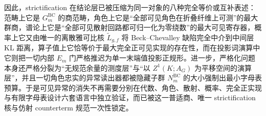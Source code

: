 





\noindent
因此，strictification 在结论层已被压缩为同一对象的八种完全等价或互补表述：范畴上它是 \(G_m^{\mathrm{BC}}\) 的商范畴，角色上它是“全部可见角色在折叠纤维上可测”的最大群商，谱论上它是“全部可见散射回路都可归一化为零绕数”的最大可见寄存器，概率上它又由唯一的离散雅可比核 \(\widetilde L_{g,f}\) 将 Beck--Chevalley 缺陷完全中介到中间层 KL 距离，算子值上它恰等价于最大完全正可见实现的存在性，而在投影词演算中它则把一切内部 \(E_m\) 门严格推迟为单一末端值投影正规形。进一步，严格化问题本身还严格分裂为“无规范余量的测度层”与“以 \(Z^1(K;A_G)\) 为平移空间的演算层”，并且一切角色忠实的异常读出器都被隐藏子群 \(N_m^{\mathrm{BC}}\) 的大小强制出最小字母表预算。于是可见异常的消失不再需要分别在代数、角色、散射、概率、完全正实现与有限字母表设计六套语言中独立验证，而已被这一普适商、唯一 strictification 核与仿射 counterterm 规范一次性锁定。

\endinput
